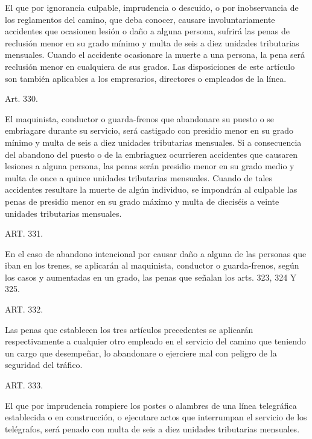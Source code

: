     El que por ignorancia culpable, imprudencia o descuido, o por inobservancia de los reglamentos del camino, que deba conocer, causare involuntariamente accidentes que ocasionen lesión o daño a alguna persona, sufrirá las penas de reclusión menor en su grado mínimo y multa de seis a diez unidades tributarias mensuales.
    Cuando el accidente ocasionare la muerte a una persona, la pena será reclusión menor en cualquiera de sus grados.
    Las disposiciones de este artículo son también aplicables a los empresarios, directores o empleados de la línea.





    Art. 330.

    El maquinista, conductor o guarda-frenos que abandonare su puesto o se embriagare durante su servicio, será castigado con presidio menor en su grado mínimo y multa de seis a diez unidades tributarias mensuales.
    Si a consecuencia del abandono del puesto o de la embriaguez ocurrieren accidentes que causaren lesiones a alguna persona, las penas serán presidio menor en su grado medio y multa de once a quince unidades tributarias mensuales.
    Cuando de tales accidentes resultare la muerte de algún individuo, se impondrán al culpable las penas de presidio menor en su grado máximo y multa de dieciséis a veinte unidades tributarias mensuales.








    ART. 331.

    En el caso de abandono intencional por causar daño a alguna de las personas que iban en los trenes, se aplicarán al maquinista, conductor o guarda-frenos, según los casos y aumentadas en un grado, las penas que señalan los arts. 323, 324 Y 325.



    ART. 332.

    Las penas que establecen los tres artículos precedentes se aplicarán respectivamente a cualquier otro empleado en el servicio del camino que teniendo un cargo que desempeñar, lo abandonare o ejerciere mal con peligro de la seguridad del tráfico.



    ART. 333.

    El que por imprudencia rompiere los postes o alambres de una línea telegráfica establecida o en construcción, o ejecutare actos que interrumpan el servicio de los telégrafos, será penado con multa de seis a diez unidades tributarias mensuales.









